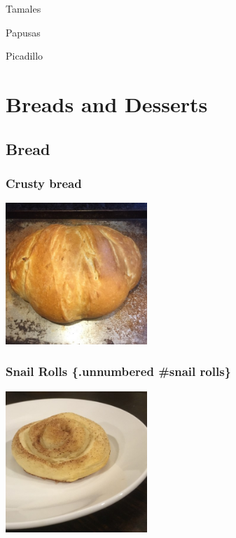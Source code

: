 \documentclass[
]{book}
\begin{document}
Tamales

Papusas

Picadillo

\hypertarget{breads-and-desserts}{%
\chapter*{Breads and Desserts}\label{breads-and-desserts}}

\hypertarget{bread}{%
\section*{Bread}\label{bread}}

\hypertarget{crustybread}{%
\subsection*{Crusty bread}\label{crustybread}}

\includegraphics[width=0.4\textwidth,height=\textheight]{crusty_bread_small.jpg}

\hypertarget{snail-rolls-.unnumbered-snail-rolls}{%
\subsection{Snail Rolls \{.unnumbered \#snail rolls\}}\label{snail-rolls-.unnumbered-snail-rolls}}

\includegraphics[width=0.4\textwidth,height=\textheight]{snail_roll_small.jpg}
\end{document}
